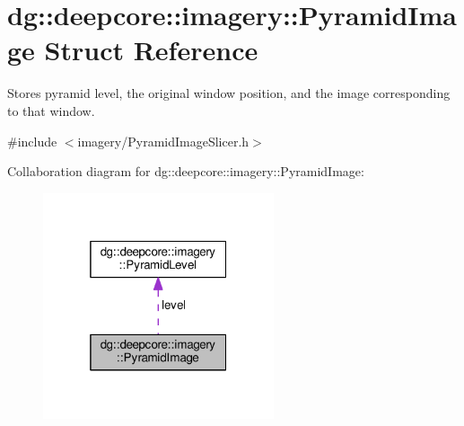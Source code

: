 \hypertarget{structdg_1_1deepcore_1_1imagery_1_1_pyramid_image}{}\section{dg\+:\+:deepcore\+:\+:imagery\+:\+:Pyramid\+Image Struct Reference}
\label{structdg_1_1deepcore_1_1imagery_1_1_pyramid_image}


Stores pyramid level, the original window position, and the image corresponding to that window.  




{\ttfamily \#include $<$imagery/\+Pyramid\+Image\+Slicer.\+h$>$}



Collaboration diagram for dg\+:\+:deepcore\+:\+:imagery\+:\+:Pyramid\+Image\+:
\nopagebreak
\begin{figure}[H]
\begin{center}
\leavevmode
\includegraphics[width=193pt]{structdg_1_1deepcore_1_1imagery_1_1_pyramid_image__coll__graph}
\end{center}
\end{figure}
